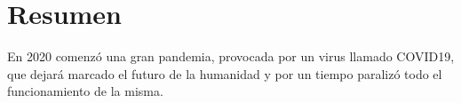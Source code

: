 
\chapter*{Resumen}

En 2020 comenzó una gran pandemia, provocada por un virus llamado COVID19, que dejará marcado el futuro de la humanidad y por un tiempo paralizó todo el funcionamiento de la misma.



